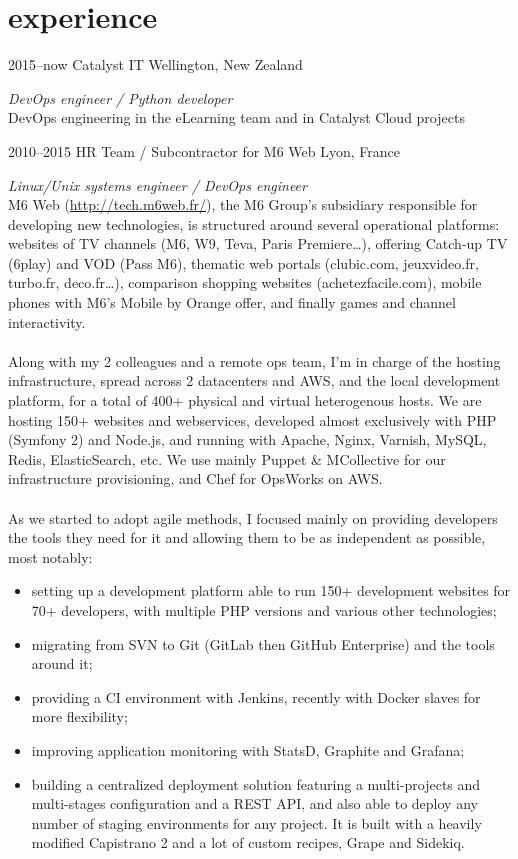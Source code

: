 \documentclass[]{friggeri-cv} %
\begin{document}
\section{experience}

\begin{entrylist}
\entry
{2015--now}
{Catalyst IT}
{Wellington, New Zealand}
{\emph{DevOps engineer / Python developer} \\
{DevOps engineering in the eLearning team and in Catalyst Cloud projects}

\entry
{2010--2015}
{HR Team / Subcontractor for M6 Web}
{Lyon, France}
{\emph{Linux/Unix systems engineer / DevOps engineer} \\
M6 Web (\url{http://tech.m6web.fr/}), the M6 Group’s subsidiary responsible for developing new technologies, is structured around several operational platforms: websites of TV channels (M6, W9, Teva, Paris Premiere\dots), offering Catch-up TV (6play) and VOD (Pass M6), thematic web portals (clubic.com, jeuxvideo.fr, turbo.fr, deco.fr\dots), comparison shopping websites (achetezfacile.com), mobile phones with M6’s Mobile by Orange offer, and finally games and channel interactivity. \\
\\
Along with my 2 colleagues and a remote ops team, I'm in charge of the hosting infrastructure, spread across 2 datacenters and AWS, and the local development platform, for a total of 400+ physical and virtual heterogenous hosts. We are hosting 150+ websites and webservices, developed almost exclusively with PHP (Symfony 2) and Node.js, and running with Apache, Nginx, Varnish, MySQL, Redis, ElasticSearch, etc. We use mainly Puppet \& MCollective for our infrastructure provisioning, and Chef for OpsWorks on AWS. \\
\\
As we started to adopt agile methods, I focused mainly on providing developers the tools they need for it and allowing them to be as independent as possible, most notably:
\begin{itemize}
  \item setting up a development platform able to run 150+ development websites for 70+ developers, with multiple PHP versions and various other technologies;
  \item migrating from SVN to Git (GitLab then GitHub Enterprise) and the tools around it;
  \item providing a CI environment with Jenkins, recently with Docker slaves for more flexibility;
  \item improving application monitoring with StatsD, Graphite and Grafana;
  \item building a centralized deployment solution featuring a multi-projects and multi-stages configuration and a REST API, and also able to deploy any number of staging environments for any project. It is built with a heavily modified Capistrano 2 and a lot of custom recipes, Grape and Sidekiq.
\end{itemize}}

}
\end{entrylist}
\end{document}

